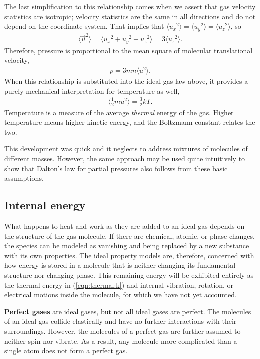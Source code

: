 The last simplification to this relationship comes when we assert that gas velocity statistics are isotropic; velocity statistics are the same in all directions and do not depend on the coordinate system.  That implies that $\langle u_x{^2} \rangle = \langle u_y{^2} \rangle = \langle u_z{^2} \rangle$, so
\begin{align}
\langle \vec{u}^2\rangle = \langle u_x{^2} + u_y{^2} + u_z{^2} \rangle = 3 \langle u_z{^2} \rangle.\label{eqn:ig:3dof}
\end{align}
Therefore, pressure is proportional to the mean square of molecular translational velocity,
\begin{align}
p = 3 m n \langle u{^2} \rangle.
\end{align}
When this relationship is substituted into the ideal gas law above, it provides a purely mechanical interpretation for temperature as well,
\begin{align}
\langle \frac{1}{2} m u{^2} \rangle = \frac{3}{2} k T.\label{eqn:thermal:k}
\end{align}
Temperature is a measure of the average \emph{thermal} energy of the gas.  Higher temperature means higher kinetic energy, and the Boltzmann constant relates the two.

This development was quick and it neglects to address mixtures of molecules of different masses.  However, the same approach may be used quite intuitively to show that Dalton's law for partial pressures also follows from these basic assumptions.

\subsection{Internal energy}\label{sec:ig:e}

What happens to heat and work as they are added to an ideal gas depends on the structure of the gas molecule.  If there are chemical, atomic, or phase changes, the species can be modeled as vanishing and being replaced by a new substance with its own properties.  The ideal property models are, therefore, concerned with how energy is stored in a molecule that is neither changing its fundamental structure nor changing phase.  This remaining energy will be exhibited entirely as the thermal energy in (\ref{eqn:thermal:k}) and internal vibration, rotation, or electrical motions inside the molecule, for which we have not yet accounted.

{\bf Perfect gases} are ideal gases, but not all ideal gases are perfect.  The molecules of an ideal gas collide elastically and have no further interactions with their surroundings.  However, the molecules of a perfect gas are further assumed to neither spin nor vibrate.  As a result, any molecule more complicated than a single atom does not form a perfect gas.

